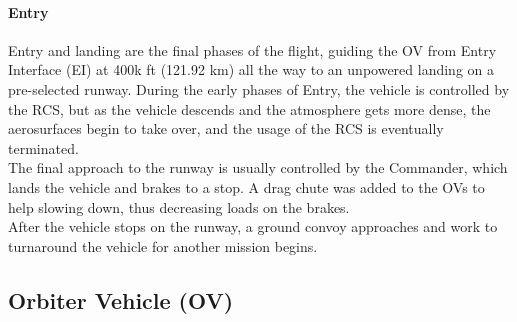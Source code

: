 \documentclass[Space_Shuttle_Vessel_Manual.tex]{subfiles}
\begin{document}
\begin{multicols*}{2}
\paragraph{Entry}
Entry and landing are the final phases of the flight, guiding the OV from Entry Interface (EI) at 400k ft (121.92 km) all the way to an unpowered landing on a pre-selected runway. During the early phases of Entry, the vehicle is controlled by the RCS, but as the vehicle descends and the atmosphere gets more dense, the aerosurfaces begin to take over, and the usage of the RCS is eventually terminated.\\
The final approach to the runway is usually controlled by the Commander, which lands the vehicle and brakes to a stop. A drag chute was added to the OVs to help slowing down, thus decreasing loads on the brakes.\\
After the vehicle stops on the runway, a ground convoy approaches and work to turnaround the vehicle for another mission begins.
\end{multicols*}

\newpage
\subsection{Orbiter Vehicle (OV)}
\end{document}
